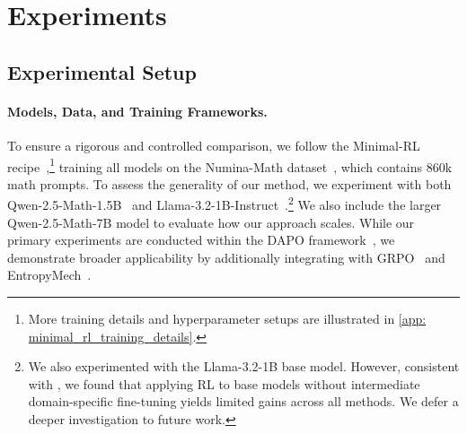 %


\section{Experiments}\label{sec:experiments}

\subsection{Experimental Setup}
\label{sec: experiment_setup}
\paragraph{Models, Data, and Training Frameworks.}
To ensure a rigorous and controlled comparison, we follow the Minimal-RL recipe~\citep{xiong2025minimalist},\footnote{More training details and hyperparameter setups are illustrated in \cref{app: minimal_rl_training_details}. } training all models on the Numina-Math dataset~\citep{numina_math_7b}, which contains 860k math prompts. To assess the generality of our method, we experiment with both Qwen-2.5-Math-1.5B~\citep{yang2024qwen2} and Llama-3.2-1B-Instruct~\citep{dubey2024llama}.\footnote{We also experimented with the Llama-3.2-1B base model. However, consistent with \citet{wang2025octothinker}, we found that applying RL to base models without intermediate domain-specific fine-tuning yields limited gains across all methods. We defer a deeper investigation to future work.} We also include the larger Qwen-2.5-Math-7B model to evaluate how our approach scales. While our primary experiments are conducted within the DAPO framework~\citep{yu2025dapo}, we demonstrate broader applicability by additionally integrating \alg with GRPO~\citep{shao2024deepseekmath} and EntropyMech~\citep{cui2025entropy}.

